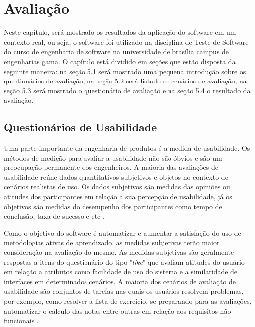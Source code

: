 \chapter{Avaliação}

Neste capítulo, será mostrado os resultados da aplicação do software em um contexto real, ou seja, o software foi
utilizado na disciplina de Teste de Software do curso de engenharia de software na universidade de brasília campus
de engenharias gama. O capítulo está dividido em seções que estão disposta da seguinte maneira: na seção 5.1 será mostrado
uma pequena introdução sobre os questionários de avaliação, na seção 5.2 será listado os cenários de avaliação, na
seção 5.3 será mostrado o questionário de avaliação e na seção 5.4 o resultado da avaliação.

\section{Questionários de Usabilidade}

Uma parte importante da engenharia de produtos é a medida de usabilidade. Os métodos de medição para avaliar a
usabilidade não são óbvios e são um preocupação permanente dos engenheiros. A maioria das avaliações de usabilidade
reúne dados quantitativos subjetivos e objetos no contexto de cenários realistas de uso. Os dados subjetivos são medidas
das opiniões ou atitudes dos participantes em relação a sua percepção de usabilidade, já os objetivos são medidas do
desempenho dos participantes como tempo de conclusão, taxa de sucesso e etc \cite{questionario}.

Como o objetivo do software é automatizar e aumentar a satisfação do uso de metodologias ativas de aprendizado, as
medidas subjetivas terão maior consideração na avaliação do mesmo. As medidas subjetivas são geralmente respostas a
itens do questionário do tipo "\textit{like}" que avaliam atitudes do usuário em relação a atributos como facilidade de uso do
sistema e a similaridade de interfaces em determinados cenários. A maioria dos cenários de avaliação de usabilidade são
conjuntos de tarefas nas quais os usuários resolvem problemas, por exemplo, como resolver a lista de exercício, se
preparando para as avaliações, automatizar o cálculo das notas entre outras em relação aos requisitos não funcionais \cite{questionario}.

